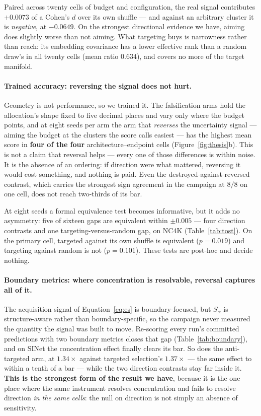 \documentclass{article}
\begin{document}
Paired across twenty cells of budget and configuration, the real signal contributes $+0.0073$ of a
Cohen's $d$ over its own shuffle --- and against an arbitrary cluster it is \emph{negative}, at
$-0.0649$. On the strongest directional evidence we have, aiming does slightly worse than not
aiming. What targeting buys is narrowness rather than reach: its embedding covariance has a lower
effective rank than a random draw's in all twenty cells (mean ratio $0.634$), and covers no more of
the target manifold.

\paragraph{Trained accuracy: reversing the signal does not hurt.} Geometry is not performance, so we
trained it. The falsification arms hold the allocation's shape fixed to five decimal places and vary
only where the budget points, and at eight seeds per arm the arm that \emph{reverses} the
uncertainty signal --- aiming the budget at the clusters the score calls easiest --- has the highest
mean score in \textbf{four of the four} architecture--endpoint cells (Figure~\ref{fig:thesis}b).
This is not a claim that reversal helps --- every one of those differences is within noise. It is
the absence of an ordering: if direction were what mattered, reversing it would cost something, and
nothing is paid. Even the destroyed-against-reversed contrast, which carries the strongest sign
agreement in the campaign at $8/8$ on one cell, does not reach two-thirds of its bar.

At eight seeds a formal equivalence test becomes informative, but it adds no asymmetry: five of
sixteen gaps are equivalent within $\pm 0.005$ --- four direction contrasts and one
targeting-versus-random gap, on NC4K (Table~\ref{tab:tost}). On the primary cell, targeted against
its own shuffle is equivalent ($p = 0.019$) and targeting against random is not ($p = 0.101$).
These tests are post-hoc and decide nothing.

\paragraph{Boundary metrics: where concentration is resolvable, reversal captures all of it.} The
acquisition signal of Equation~\ref{eq:es} is boundary-focused, but $S_\alpha$ is structure-aware
rather than boundary-specific, so the campaign never measured the quantity the signal was built to
move. Re-scoring every run's committed predictions with two boundary metrics closes that gap
(Table~\ref{tab:boundary}), and on SINet the concentration effect finally clears its bar. So does
the anti-targeted arm, at $1.34\times$ against targeted selection's $1.37\times$ --- the same effect
to within a tenth of a bar --- while the two direction contrasts stay far inside it.
\textbf{This is the strongest form of the result we have}, because it is the one place where the
same instrument resolves concentration and fails to resolve direction \emph{in the same cells}: the
null on direction is not simply an absence of sensitivity.
\end{document}

